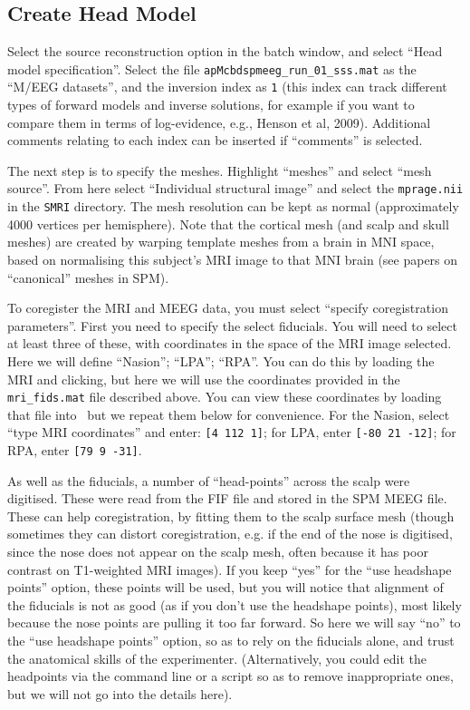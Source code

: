 \subsection{Create Head Model}

Select the source reconstruction option in the batch window, and select ``Head model specification''. Select the file \texttt{apMcbdspmeeg\_run\_01\_sss.mat} as the ``M/EEG datasets'', and the inversion index as \texttt{1} (this index can track different types of forward models and inverse solutions, for example if you want to compare them in terms of log-evidence, e.g., Henson et al, 2009). Additional comments relating to each index can be inserted if ``comments'' is selected. 

The next step is to specify the meshes. Highlight ``meshes'' and select ``mesh source''. From here select ``Individual structural image'' and select the \texttt{mprage.nii} in the \texttt{SMRI} directory. The mesh resolution can be kept as normal (approximately 4000 vertices per hemisphere). Note that the cortical mesh (and scalp and skull meshes) are created by warping template meshes from a brain in MNI space, based on normalising this subject's MRI image to that MNI brain (see papers on ``canonical'' meshes in SPM).

To coregister the MRI and MEEG data, you must select ``specify coregistration parameters''. First you need to specify the select fiducials. You will need to select at least three of these, with coordinates in the space of the MRI image selected. Here we will define ``Nasion''; ``LPA''; ``RPA''. You can do this by loading the MRI and clicking, but here we will use the coordinates provided in the \texttt{mri\_fids.mat} file described above. You can view these coordinates by loading that file into \matlab\, but we repeat them below for convenience. For the Nasion, select ``type MRI coordinates'' and enter: \texttt{[4 112 1]}; for LPA, enter \texttt{[-80 21 -12]}; for RPA, enter \texttt{[79 9 -31]}.

As well as the fiducials, a number of ``head-points'' across the scalp were digitised. These were read from the FIF file and stored in the SPM MEEG file. These can help coregistration, by fitting them to the scalp surface mesh (though sometimes they can distort coregistration, e.g. if the end of the nose is digitised, since the nose does not appear on the scalp mesh, often because it has poor contrast on T1-weighted MRI images). If you keep ``yes'' for the ``use headshape points'' option, these points will be used, but you will notice that alignment of the fiducials is not as good (as if you don't use the headshape points), most likely because the nose points are pulling it too far forward. So here we will say ``no'' to the ``use headshape points'' option, so as to rely on the fiducials alone, and trust the anatomical skills of the experimenter. (Alternatively, you could edit the headpoints via the command line or a script so as to remove inappropriate ones, but we will not go into the details here).

